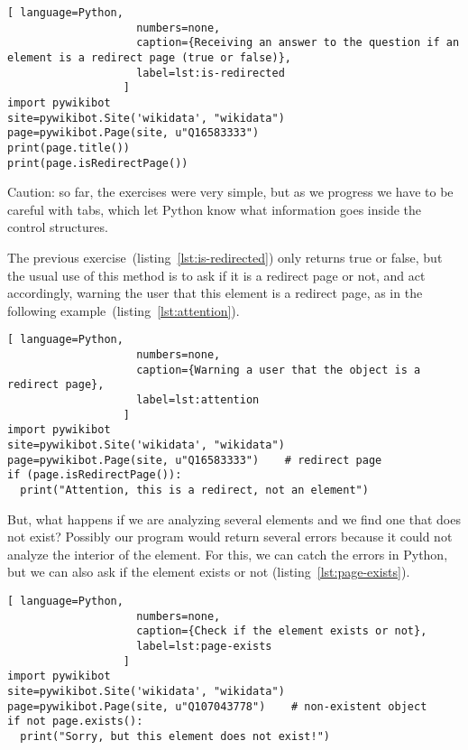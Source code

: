 \begin{lstlisting}[ language=Python,
                    numbers=none,
                    caption={Receiving an answer to the question if an element is a redirect page (true or false)},
                    label=lst:is-redirected
                  ]
import pywikibot
site=pywikibot.Site('wikidata', "wikidata")
page=pywikibot.Page(site, u"Q16583333")
print(page.title())
print(page.isRedirectPage())
\end{lstlisting}

Caution: so far, the exercises were very simple, but as we progress we have to be careful with tabs, which let Python know what information goes inside the control structures.

The previous exercise~(listing~\ref{lst:is-redirected}) only returns true or false, but the usual use of this method is to ask if it is a redirect page or not, and act accordingly, warning the user that this element is a redirect page, as in the following example~(listing~\ref{lst:attention}).

\begin{lstlisting}[ language=Python,
                    numbers=none,
                    caption={Warning a user that the object is a redirect page},
                    label=lst:attention
                  ]
import pywikibot
site=pywikibot.Site('wikidata', "wikidata")
page=pywikibot.Page(site, u"Q16583333")    # redirect page
if (page.isRedirectPage()):
  print("Attention, this is a redirect, not an element")
\end{lstlisting}

But, what happens if we are analyzing several elements and we find one that does not exist? Possibly our program would return several errors because it could not analyze the interior of the element. For this, we can catch the errors in Python, but we can also ask if the element exists or not (listing~\ref{lst:page-exists}).

\begin{lstlisting}[ language=Python,
                    numbers=none,
                    caption={Check if the element exists or not},
                    label=lst:page-exists
                  ]
import pywikibot
site=pywikibot.Site('wikidata', "wikidata")
page=pywikibot.Page(site, u"Q107043778")    # non-existent object
if not page.exists():
  print("Sorry, but this element does not exist!")
\end{lstlisting}

